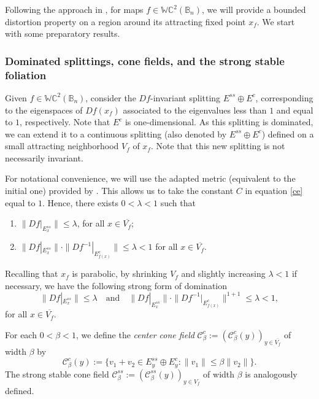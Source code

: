 \documentclass[11pt,reqno]{amsart}
\theoremstyle{plain}
\newtheorem*{theorem A}{Theorem A}
\newtheorem*{theorem B}{Theorem B}
\newtheorem*{theorem C}{Theorem C}
\newtheorem*{theorem 1}{Theorem 1}
\newtheorem*{theorem 2}{Theorem 2}
\newtheorem*{theorem 3}{Theorem 3}
\numberwithin{equation}{section}
\begin{document}
Following the approach in \cite{alves2000srb, zaj2018physical}, for maps $f\in \mathbb{WC}^2 ( \mathbb{B}_n)$, we will provide a bounded distortion property on a region around its attracting fixed point $x_f$.
We start with some preparatory results.

\subsubsection{Dominated splittings, cone fields, and the strong stable foliation}

Given $f\in \mathbb{WC}^2 ( \mathbb{B}_n)$, consider the $Df$-invariant splitting $E^{ss} \oplus E^{c}$, corresponding to the eigenspaces of $Df(x_f)$ associated to the eigenvalues less than $1$ and equal to $1$, respectively.
Note that $E^c$ is one-dimensional.
As this splitting is dominated, we can extend it to a continuous splitting (also denoted by $E^{ss}\oplus E^{c}$) defined on a small attracting neighborhood $V_f$ of $x_f$.
Note that this new splitting is not necessarily invariant.

For notational convenience, we will use the adapted metric (equivalent to the initial one) provided by \cite[Theorem 1]{gourmelon2007adapted}.
This allows us to take the constant $C$ in equation \eqref{ce} equal to $1$.
Hence, there exists $0< \lambda<1$ such that
\begin{enumerate}
\item $\|D f|_{E^{ss}_x}\| \leq \lambda$, for all $x \in \overline{V_f}$;
\item $\|D f|_{E^{ss}_x}\| \cdot \|D f^{-1}|_{E^{c}_{f(x)}}\| \leq \lambda<1$ for all $x \in \overline{V_f}$.
\end{enumerate}
Recalling that $x_f$ is parabolic, by shrinking $V_f$ and slightly increasing $\lambda<1$ if necessary, we have the following strong form of domination
\begin{equation}
\label{strongversionii}
\|D f|_{E^{ss}_x}\| \leq \lambda \quad \text{and} \quad \|D f|_{E^{ss}_x}\| \cdot \|D f^{-1}|_{E^{c}_{f(x)}}\|^{1+1} \leq \lambda< 1,
\end{equation}
for all $x \in \overline{V_f}$.

For each $0<\beta<1$, we define the \emph{center cone field} $\mathcal{C}_\beta ^{c}:= (\mathcal{C}_\beta ^{c}(y))_{y \in \overline{V_f}}$ of width $\beta$ by
\begin{equation*}
\mathcal{C}_\beta ^{c}(y):=\{v_1 +v_2 \in E^{ss}_y \oplus E^{c}_y : \|v_1\| \leq \beta \|v_2\|\}.
\end{equation*}
The strong stable cone field $\mathcal{C}_\beta ^{ss}:= (\mathcal{C}_\beta ^{ss}(y))_{y \in V_f}$ of width $\beta$ is analogously defined.
\end{document}
